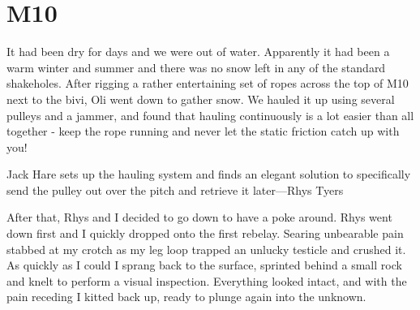 \section{M10}
\begin{marginfigure}
\end{marginfigure}
It had been dry for days and we were out of water. Apparently it had been a warm winter and summer and there was no snow left in any of the standard shakeholes. After rigging a rather entertaining set of ropes across the top of M10 next to the bivi, Oli went down to gather snow. We hauled it up using several pulleys and a jammer, and found that hauling continuously is a lot easier than all together - keep the rope running and never let the static friction catch up with you!

\begin{marginfigure}
\checkoddpage \ifoddpage \forcerectofloat \else \forceversofloat \fi
\centering
 \caption{Jack Hare sets up the hauling system and finds an elegant solution to specifically send the pulley out over the pitch and retrieve it later---Rhys Tyers}
 \label{near sump}
\end{marginfigure}

After that, Rhys and I decided to go down to have a poke around. Rhys went down first and I quickly dropped onto the first rebelay. Searing unbearable pain stabbed at my crotch as my leg loop trapped an unlucky testicle and crushed it. As quickly as I could I sprang back to the surface, sprinted behind a small rock and knelt to perform a visual inspection. Everything looked intact, and with the pain receding I kitted back up, ready to plunge again into the unknown.

